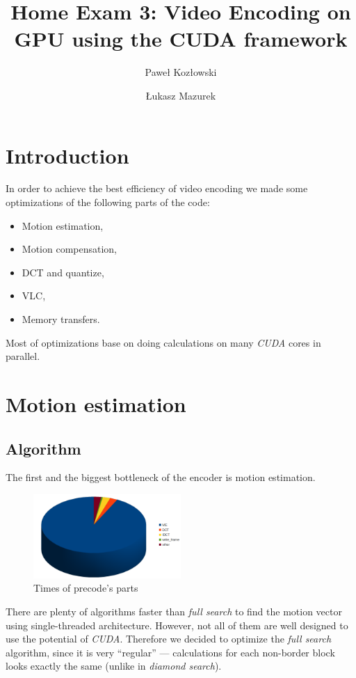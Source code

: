 \documentclass[11pt]{article}
\title{Home Exam 3: Video Encoding on GPU using the CUDA framework}
\author{Paweł Kozłowski \and Łukasz Mazurek}
\begin{document}
\maketitle
\pagebreak
\tableofcontents
\pagebreak

\section{Introduction}
In order to achieve the best efficiency of video encoding we made some optimizations of the following parts of the code:
\begin{itemize}
  \item Motion estimation,
  \item Motion compensation,
  \item DCT and quantize,
  \item VLC,
  \item Memory transfers.
\end{itemize}
Most of optimizations base on doing calculations on many \emph{CUDA} cores
in parallel.

\section{Motion estimation}

\subsection{Algorithm}
The first and the biggest bottleneck of the encoder is motion estimation.

\begin{figure}[h]
\centering
\includegraphics[width=0.5\textwidth]{images/precode.png}
\caption{Times of precode's parts}
\end{figure}

\noindent
There are plenty of algorithms faster than \emph{full search} to find the
motion vector using single-threaded architecture.
However, not all of them are well designed to use the potential of \emph{CUDA}.
Therefore we decided to optimize the \emph{full search} algorithm, since
it is very ``regular'' --- calculations for each non-border block looks exactly
the same (unlike in \emph{diamond search}).
\end{document}
